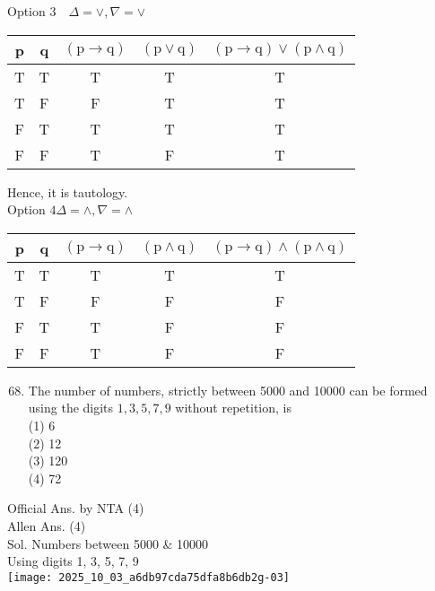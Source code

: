 \documentclass[10pt]{article}
\begin{document}
Option \(3 \quad \Delta=\vee, \nabla=\vee\)

\begin{center}
\begin{tabular}{|c|c|c|c|c|}
\hline
p & q & \((\mathrm{p} \rightarrow \mathrm{q})\) & \((\mathrm{p} \vee \mathrm{q})\) & \((\mathrm{p} \rightarrow \mathrm{q}) \vee(\mathrm{p} \wedge \mathrm{q})\) \\
\hline
T & T & T & T & T \\
\hline
T & F & F & T & T \\
\hline
F & T & T & T & T \\
\hline
F & F & T & F & T \\
\hline
\end{tabular}
\end{center}

Hence, it is tautology.\\
Option \(4 \Delta=\wedge, \nabla=\wedge\)

\begin{center}
\begin{tabular}{|c|c|c|c|c|}
\hline
p & q & \((\mathrm{p} \rightarrow \mathrm{q})\) & \((\mathrm{p} \wedge \mathrm{q})\) & \((\mathrm{p} \rightarrow \mathrm{q}) \wedge(\mathrm{p} \wedge \mathrm{q})\) \\
\hline
T & T & T & T & T \\
\hline
T & F & F & F & F \\
\hline
F & T & T & F & F \\
\hline
F & F & T & F & F \\
\hline
\end{tabular}
\end{center}

\begin{enumerate}
  \setcounter{enumi}{67}
  \item The number of numbers, strictly between 5000 and 10000 can be formed using the digits \(1,3,5,7,9\) without repetition, is\\
(1) 6\\
(2) 12\\
(3) 120\\
(4) 72
\end{enumerate}

Official Ans. by NTA (4)\\
Allen Ans. (4)\\
Sol. Numbers between 5000 \& 10000\\
Using digits 1, 3, 5, 7, 9\\
\texttt{[image: 2025\_10\_03\_a6db97cda75dfa8b6db2g-03]}
\end{document}
